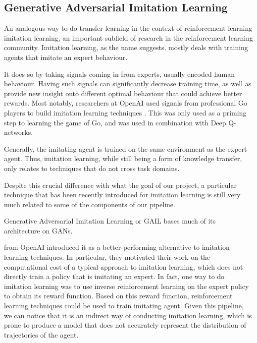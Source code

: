 \subsection{Generative Adversarial Imitation Learning}

An analogous way to do transfer learning in the context of reinforcement learning imitation learning, an important subfield of research in the reinforcement learning community. Imitation learning, as the name suggests, mostly deals with training agents that imitate an expert behaviour. 

It does so by taking signals coming in from experts, usually encoded human behaviour. Having such signals can significantly decrease training time, as well as provide new insight onto different optimal behaviour that could achieve better rewards. Most notably, researchers at OpenAI used signals from professional Go players to build imitation learning techniques \citep{silver2016mastering}. This was only used as a priming step to learning the game of Go, and was used in combination with Deep Q-networks.

Generally, the imitating agent is trained on the same environment as the expert agent. Thus, imitation learning, while still being a form of knowledge transfer, only relates to techniques that do not cross task domains.

Despite this crucial difference with what the goal of our project, a particular technique that has been recently introduced for imitation learning is still very much related to some of the components of our pipeline.

Generative Adversarial Imitation Learning \citep{ho2016generative} or GAIL bases much of its architecture on GANs.

\citeauthor{ho2016generative} from OpenAI introduced it as a better-performing alternative to imitation learning techniques. In particular, they motivated their work on the computational cost of a typical approach to imitation learning, which does not directly train a policy that is imitating an expert.
In fact, one way to do imitation learning was to use inverse reinforcement learning on the expert policy to obtain its reward function. Based on this reward function, reinforcement learning techniques could be used to train imitating agent. Given this pipeline, we can notice that it is an indirect way of conducting imitation learning, which is prone to produce a model that does not accurately represent the distribution of trajectories of the agent.

